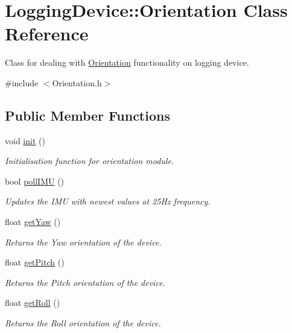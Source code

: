 \hypertarget{class_logging_device_1_1_orientation}{}\section{Logging\+Device\+:\+:Orientation Class Reference}
\label{class_logging_device_1_1_orientation}


Class for dealing with \hyperlink{class_logging_device_1_1_orientation}{Orientation} functionality on logging device.  




{\ttfamily \#include $<$Orientation.\+h$>$}

\subsection*{Public Member Functions}
\begin{DoxyCompactItemize}
\item 
void \hyperlink{class_logging_device_1_1_orientation_a317461c5c8afa8c3abf56847d4544728}{init} ()
\begin{DoxyCompactList}\small\item\em Initialisation function for orientation module. \end{DoxyCompactList}\item 
bool \hyperlink{class_logging_device_1_1_orientation_aad568a473f999c181abac46a4d832387}{poll\+I\+MU} ()
\begin{DoxyCompactList}\small\item\em Updates the I\+MU with newest values at 25\+Hz frequency. \end{DoxyCompactList}\item 
float \hyperlink{class_logging_device_1_1_orientation_a3dbaa1ee014811c40d5b9f39b544c19b}{get\+Yaw} ()
\begin{DoxyCompactList}\small\item\em Returns the Yaw orientation of the device. \end{DoxyCompactList}\item 
float \hyperlink{class_logging_device_1_1_orientation_a7ec1a2964fc858bbd5da22a505b087c8}{get\+Pitch} ()
\begin{DoxyCompactList}\small\item\em Returns the Pitch orientation of the device. \end{DoxyCompactList}\item 
float \hyperlink{class_logging_device_1_1_orientation_ab8923432cb8c18822b0a9ae95a5ac505}{get\+Roll} ()
\begin{DoxyCompactList}\small\item\em Returns the Roll orientation of the device. \end{DoxyCompactList}\end{DoxyCompactItemize}
